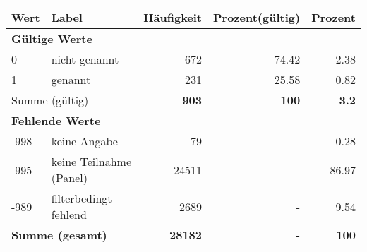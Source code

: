      \begin{longtable}{lXrrr}
     \toprule
     \textbf{Wert} & \textbf{Label} & \textbf{Häufigkeit} & \textbf{Prozent(gültig)} & \textbf{Prozent} \\
     \endhead
     \midrule
     \multicolumn{5}{l}{\textbf{Gültige Werte}}\\

     0 &
     \multicolumn{1}{X}{ nicht genannt   } &


       \num{672} &
       \num[round-mode=places,round-precision=2]{74.42} &
         \num[round-mode=places,round-precision=2]{2.38} \\

     1 &
     \multicolumn{1}{X}{ genannt   } &


       \num{231} &
       \num[round-mode=places,round-precision=2]{25.58} &
         \num[round-mode=places,round-precision=2]{0.82} \\
     \midrule
     \multicolumn{2}{l}{Summe (gültig)} &
       \textbf{\num{903}} &
     \textbf{100} &
       \textbf{\num[round-mode=places,round-precision=2]{3.2}} \\
     \multicolumn{5}{l}{\textbf{Fehlende Werte}}\\
       -998 &
       keine Angabe &
         \num{79} &
        - &
         \num[round-mode=places,round-precision=2]{0.28} \\
       -995 &
       keine Teilnahme (Panel) &
         \num{24511} &
        - &
         \num[round-mode=places,round-precision=2]{86.97} \\
       -989 &
       filterbedingt fehlend &
         \num{2689} &
        - &
         \num[round-mode=places,round-precision=2]{9.54} \\
     \midrule
     \multicolumn{2}{l}{\textbf{Summe (gesamt)}} &
          \textbf{\num{28182}} &
        \textbf{-} &
        \textbf{100} \\
     \bottomrule
     \end{longtable}
     
